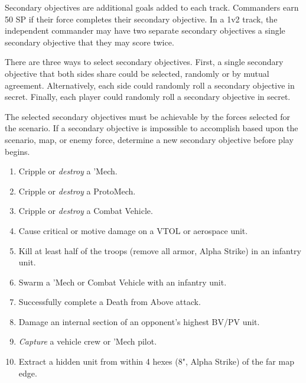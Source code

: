 Secondary objectives are additional goals added to each track.
Commanders earn 50 SP if their force completes their secondary objective.
In a 1v2 track, the independent commander may have two separate secondary objectives a single secondary objective that they may score twice.

There are three ways to select secondary objectives.
First, a single secondary objective that both sides share could be selected, randomly or by mutual agreement.
Alternatively, each side could randomly roll a secondary objective in secret.
Finally, each player could randomly roll a secondary objective in secret.

The selected secondary objectives must be achievable by the forces selected for the scenario.
If a secondary objective is impossible to accomplish based upon the scenario, map, or enemy force, determine a new secondary objective before play begins.

\begin{enumerate}

\item Cripple or \emph{destroy} a 'Mech.

\item Cripple or \emph{destroy} a ProtoMech.

\item Cripple or \emph{destroy} a Combat Vehicle.

\item Cause critical or motive damage on a VTOL or aerospace unit.

\item Kill at least half of the troops (remove all armor, Alpha Strike) in an infantry unit.

\item Swarm a 'Mech or Combat Vehicle with an infantry unit.

\item Successfully complete a Death from Above attack.

\item Damage an internal section of an opponent's highest BV/PV unit.

\item \emph{Capture} a vehicle crew or 'Mech pilot.

\item Extract a hidden unit from within 4 hexes (8", Alpha Strike) of the far map edge.

\end{enumerate}
